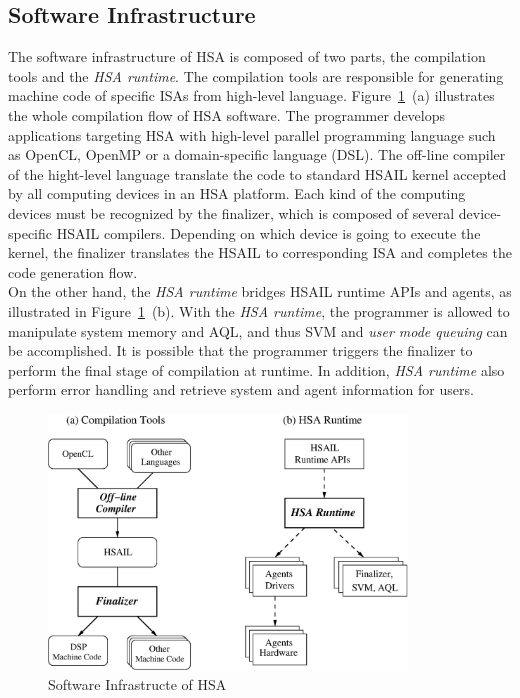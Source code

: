         \subsection{Software Infrastructure}
        The software infrastructure of HSA is composed of two parts, the compilation tools and the \textit{HSA runtime}.   
        The compilation tools are responsible for generating machine code of specific ISAs from high-level language.
        Figure~\ref{fig:swinf}~(a) illustrates the whole compilation flow of HSA software.
        The programmer develops applications targeting HSA with high-level parallel programming language such as OpenCL, OpenMP or a domain-specific language (DSL).
        The off-line compiler of the hight-level language translate the code to standard HSAIL kernel accepted by all computing devices in an HSA platform.
        Each kind of the computing devices must be recognized by the finalizer, 
        which is composed of several device-specific HSAIL compilers.
        Depending on which device is going to execute the kernel, 
        the finalizer translates the HSAIL to corresponding ISA and completes the code generation flow.
        \\\indent
        On the other hand, the \textit{HSA runtime} bridges HSAIL runtime APIs and agents, as illustrated in Figure~\ref{fig:swinf}~(b).
        With the \textit{HSA runtime}, the programmer is allowed to manipulate system memory and AQL, 
        and thus SVM and \textit{user mode queuing} can be accomplished.
        It is possible that the programmer triggers the finalizer to perform the final stage of compilation at runtime.
        In addition, \textit{HSA runtime} also perform error handling and retrieve system and agent information for users.
        \vspace{\textfig}
        \begin{figure}[!ht] 
            \centering
            \includegraphics[width=0.85\textwidth]{./figs/swinf.eps}
            \caption{Software Infrastructe of HSA}
            \label{fig:swinf}
        \end{figure}

